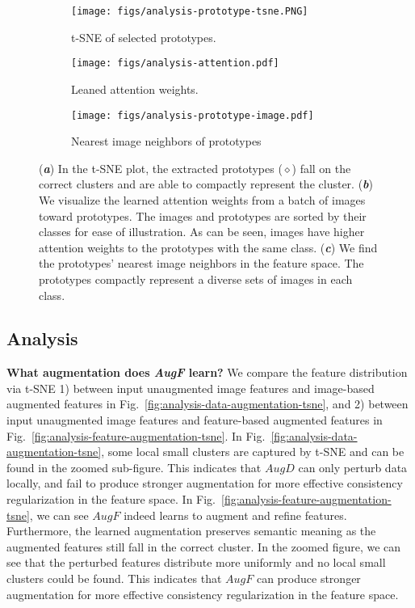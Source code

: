 \documentclass[runningheads]{llncs}
\begin{document}
\begin{figure}[t]
\centering
\begin{subfigure}{0.51\textwidth}
  \centering
  \texttt{[image: figs/analysis-prototype-tsne.PNG]}
  \caption{t-SNE of selected prototypes.}
  \label{fig:analysis-prototype-tsne}
\end{subfigure}
\begin{subfigure}{0.36\textwidth}
  \centering
  \texttt{[image: figs/analysis-attention.pdf]}
  \caption{Leaned attention weights.}
  \label{fig:analysis-attention}
\end{subfigure}

\begin{subfigure}{0.9\textwidth}
  \centering
  \texttt{[image: figs/analysis-prototype-image.pdf]}
  \caption{Nearest image neighbors of prototypes}
  \label{fig:analysis-prototype-image}
\end{subfigure}
\caption{
(\textit{\textbf{a}}) In the t-SNE plot, the extracted prototypes ($\diamond$) fall on the correct clusters and are able to compactly represent the cluster.
(\textit{\textbf{b}}) We visualize the learned attention weights from a batch of images toward prototypes.
The images and prototypes are sorted by their classes for ease of illustration.
As can be seen, images have higher attention weights to the prototypes with the same class.
(\textit{\textbf{c}}) We find the prototypes' nearest image neighbors in the feature space.
The prototypes compactly represent a diverse sets of images in each class.
}
\label{fig:analysis-augf}
\end{figure}

\subsection{Analysis}\label{section:analysis}
\textbf{What augmentation does \textit{AugF} learn?}
We compare the feature distribution via t-SNE 1) between input unaugmented image features and image-based augmented features in Fig.~\ref{fig:analysis-data-augmentation-tsne}, and 2) between input unaugmented image features and feature-based augmented features in Fig.~\ref{fig:analysis-feature-augmentation-tsne}.
In Fig.~\ref{fig:analysis-data-augmentation-tsne}, some local small clusters are captured by t-SNE and can be found in the zoomed sub-figure.
This indicates that $AugD$ can only perturb data locally, and fail to produce stronger augmentation for more effective consistency regularization in the feature space.
In Fig.~\ref{fig:analysis-feature-augmentation-tsne}, we can see $AugF$ indeed learns to augment and refine features.
Furthermore, the learned augmentation preserves semantic meaning as the augmented features still fall in the correct cluster.
In the zoomed figure, we can see that the perturbed features distribute more uniformly and no local small clusters could be found.
This indicates that $AugF$ can produce stronger augmentation for more effective consistency regularization in the feature space.
\end{document}
